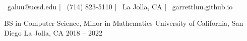 \documentclass[]{awesome-cv}
\begin{document}
\begin{center}
	\vspace{-5mm}
	  \\
	\vspace{2mm}
	{\faEnvelope\ galuu@ucsd.edu} | {\faMobile\ (714) 823-5110} | {\faMapMarker\ La Jolla, CA} | {\faLink\ garrettluu.github.io}
\end{center}
\begin{cventries}
	\cventry
	{BS in Computer Science, Minor in Mathematics}
	{University of California, San Diego}
	{La Jolla, CA}
	{2018 – 2022}
	{}
\end{cventries}
\end{document}
